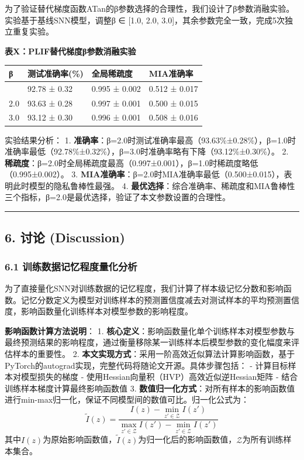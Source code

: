 \documentclass[
]{article}
\begin{document}
为了验证替代梯度函数ATan的β参数选择的合理性，我们设计了β参数消融实验。实验基于基线SNN模型，调整β
∈ {[}1.0, 2.0, 3.0{]}，其余参数完全一致，完成5次独立重复实验。

\textbf{表X：PLIF替代梯度β参数消融实验}

\begin{longtable}[]{@{}llll@{}}
\toprule\noalign{}
β & 测试准确率(\%) & 全局稀疏度 & MIA准确率 \\
\midrule\noalign{}
\endhead
\bottomrule\noalign{}
\endlastfoot
1.0 & 92.78 ± 0.32 & 0.995 ± 0.002 & 0.512 ± 0.017 \\
2.0 & 93.63 ± 0.28 & 0.997 ± 0.001 & 0.500 ± 0.015 \\
3.0 & 93.12 ± 0.30 & 0.996 ± 0.001 & 0.508 ± 0.016 \\
\end{longtable}

实验结果分析： 1.
\textbf{准确率}：β=2.0时测试准确率最高（93.63\%±0.28\%），β=1.0时准确率最低（92.78\%±0.32\%），β=3.0时准确率略有下降（93.12\%±0.30\%）。
2.
\textbf{稀疏度}：β=2.0时全局稀疏度最高（0.997±0.001），β=1.0时稀疏度略低（0.995±0.002）。
3.
\textbf{MIA准确率}：β=2.0时MIA准确率最低（0.500±0.015），表明此时模型的隐私鲁棒性最强。
4.
\textbf{最优选择}：综合准确率、稀疏度和MIA鲁棒性三个指标，β=2.0是最优选择，验证了本文参数设置的合理性。

\begin{center}\rule{0.5\linewidth}{0.5pt}\end{center}

\subsection{6. 讨论 (Discussion)}\label{ux8ba8ux8bba-discussion}

\subsubsection{6.1
训练数据记忆程度量化分析}\label{ux8badux7ec3ux6570ux636eux8bb0ux5fc6ux7a0bux5ea6ux91cfux5316ux5206ux6790}

为了直接量化SNN对训练数据的记忆程度，我们计算了样本级记忆分数和影响函数。记忆分数定义为模型对训练样本的预测置信度减去对测试样本的平均预测置信度，影响函数量化训练样本对模型参数的影响程度。

\textbf{影响函数计算方法说明}： 1.
\textbf{核心定义}：影响函数量化单个训练样本对模型参数与最终预测结果的影响程度，通过衡量移除某一训练样本后模型参数的变化幅度来评估样本的重要性。
2.
\textbf{本文实现方式}：采用一阶高效近似算法计算影响函数，基于PyTorch的autograd实现，完整代码将随论文开源。具体步骤包括：
- 计算目标样本对模型损失的梯度 -
使用Hessian向量积（HVP）高效近似逆Hessian矩阵 -
结合训练样本梯度计算最终影响函数值 3.
\textbf{数值归一化方式}：对所有样本的影响函数值进行min-max归一化，保证不同模型间的数值可比。归一化公式为：
\[ \tilde{I}(z) = \frac{I(z) - \min_{z' \in \mathcal{Z}} I(z')}{\max_{z' \in \mathcal{Z}} I(z') - \min_{z' \in \mathcal{Z}} I(z')} \]
其中\(I(z)\)为原始影响函数值，\(\tilde{I}(z)\)为归一化后的影响函数值，\(\mathcal{Z}\)为所有训练样本集合。
\end{document}
